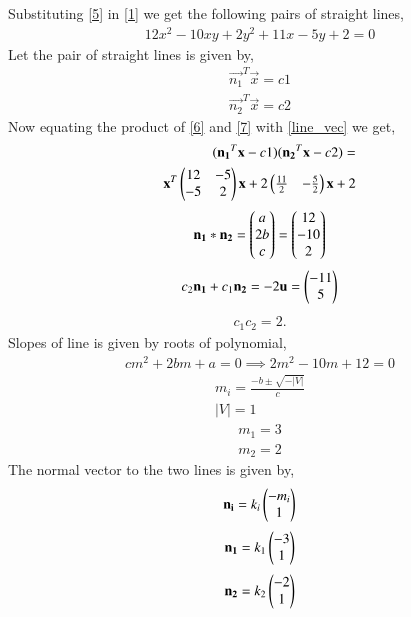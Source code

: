 \documentclass[journal,12pt,twocolumn]{IEEEtran}
\begin{document}
Substituting \eqref{5} in \eqref{1} we get the following pairs of straight lines,
\begin{align}
 12x^2-10xy+2y^2+11x-5y+2=0
\end{align}
 Let the pair of straight lines is given by,
\begin{align}
\vec{n_1}^T\vec{x} = c1
\label{6}
\end{align}
\begin{align}
\vec{n_2}^T\vec{x} = c2
\label{7}
\end{align}
Now equating the product of \eqref{6} and \eqref{7} with \eqref{line_vec} we get,
\begin{align}
(\mathbf{n_1}^T\mathbf{x} - c1)(\mathbf{n_2}^T\mathbf{x} - c2) = \\\mathbf{x}^T\begin{pmatrix}12&-5\\-5&2\end{pmatrix}\mathbf{x} + 2\begin{pmatrix}\frac{11}{2}& -\frac{5}{2}\end{pmatrix}\mathbf{x} +2 
\end{align}
\begin{align}
\mathbf{n_1} *\mathbf{n_2} = \begin{pmatrix}a\\2b\\c\end{pmatrix}=\begin{pmatrix}12\\-10\\2\end{pmatrix}
\label{verify}
\end{align}
\begin{align}
c_2\mathbf{n_1}+c_1\mathbf{n_2} = -2\mathbf{u}=\begin{pmatrix}-11\\5\end{pmatrix}
\label{sub1}
\end{align}
\begin{align}
c_1c_2 = 2.
\end{align}
Slopes of line is given by roots of polynomial,
\begin{align}
cm^2 + 2bm + a = 0
\implies 2m^2-10m+12=0
\end{align} 
\begin{align}
m_i = \frac{-b\pm\sqrt{-|V|}}{c}\\
|V|=1
\end{align}
\begin{align}
m_1=3\\
m_2=2
\end{align}
The normal vector to the two lines is given by,
\begin{align}
\mathbf{n_i} = k_i\begin{pmatrix}-m_i\\1\end{pmatrix}
\end{align}
\begin{align}
\mathbf{n_1} = k_1\begin{pmatrix}-3\\1\end{pmatrix}
\end{align}
\begin{align}
\mathbf{n_2} = k_2\begin{pmatrix}-2\\1\end{pmatrix}
\end{align}
\end{document}
